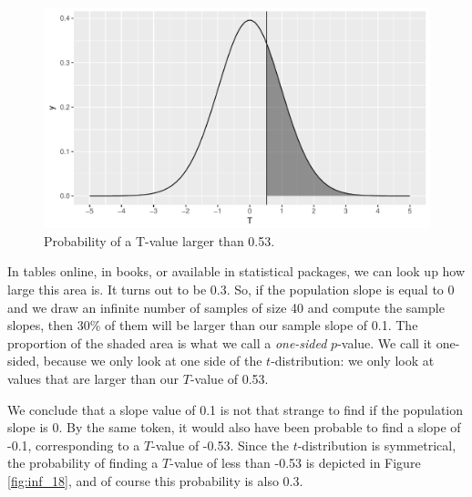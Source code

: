 \documentclass[]{report}\usepackage[]{graphicx}\usepackage[]{color}
\makeatletter
\def\maxwidth{ %
  \ifdim\Gin@nat@width>\linewidth
    \linewidth
  \else
    \Gin@nat@width
  \fi
}
\newenvironment{knitrout}{}{} %
\makeatother
\begin{document}
\begin{knitrout}
\color{fgcolor}\begin{figure}

{\centering \includegraphics[width=\maxwidth]{figure/inf_17-1} 

}

\caption[Probability of a T-value larger than 0.53]{Probability of a T-value larger than 0.53.}\label{fig:inf_17}
\end{figure}


\end{knitrout}

In tables online, in books, or available in statistical packages, we can look up how large this area is. It turns out to be 0.3. So, if the population slope is equal to 0 and we draw an infinite number of samples of size 40 and compute the sample slopes, then 30\% of them will be larger than our sample slope of 0.1. The proportion of the shaded area is what we call a \textit{one-sided} $p$-value. We call it one-sided, because we only look at one side of the $t$-distribution: we only look at values that are larger than our $T$-value of 0.53.

We conclude that a slope value of 0.1 is not that strange to find if the population slope is 0. By the same token, it would also have been probable to find a slope of -0.1, corresponding to a $T$-value of -0.53. Since the $t$-distribution is symmetrical, the probability of finding a $T$-value of less than -0.53 is depicted in Figure \ref{fig:inf_18}, and of course this probability is also 0.3.
\end{document}
